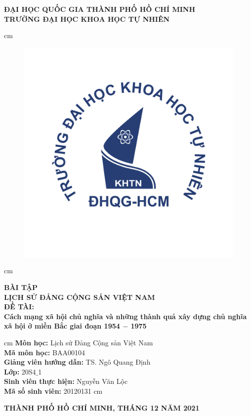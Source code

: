 \begin{titlepage}
\begin{mybox}
\begin{center}
\fontsize{12}{12}\selectfont
\textbf{ĐẠI HỌC QUỐC GIA THÀNH PHỐ HỒ CHÍ MINH}\\
\textbf{TRƯỜNG ĐẠI HỌC KHOA HỌC TỰ NHIÊN}
\end{center}
 cm
\begin{figure}[H]
\begin{center}
\includegraphics[scale=0.25]{figures/logo_hcmus}
\end{center}
\end{figure}
 cm
\begin{center}
\fontsize{18}{14}\selectfont
\textbf{BÀI TẬP}\\
\fontsize{22}{16}\selectfont
\textbf{LỊCH SỬ ĐẢNG CỘNG SẢN VIỆT NAM}\\
\fontsize{18}{12}\selectfont
\textbf{ĐỀ TÀI: }\\
\textbf{Cách mạng xã hội chủ nghĩa và những thành quả xây dựng chủ nghĩa xã hội ở miền Bắc giai đoạn 1954 $-$ 1975}
\end{center}
 cm
\fontsize{14}{12}\selectfont
\textbf{Môn học:} Lịch sử Đảng Cộng sản Việt Nam\\
\textbf{Mã môn học:} BAA00104\\
\textbf{Giảng viên hướng dẫn:} TS. Ngô Quang Định\\
\textbf{Lớp:} 20S4$\_$1\\
\textbf{Sinh viên thực hiện:} Nguyễn Văn Lộc\\
\textbf{Mã số sinh viên:} 20120131
 cm
\begin{center}
\textbf{THÀNH PHỐ HỒ CHÍ MINH, THÁNG 12 NĂM 2021}
\end{center}
\end{mybox}
\end{titlepage}